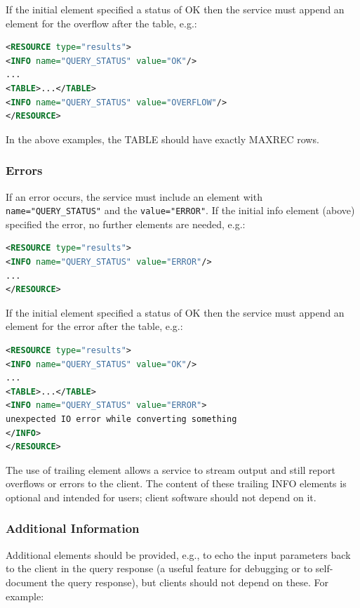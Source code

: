 \documentclass[11pt,letter]{ivoa}
\begin{document}
If the initial  element specified a status of OK then the service must 
append an  element for the overflow after the table, e.g.:

\begin{lstlisting}[language=XML]
<RESOURCE type="results">
<INFO name="QUERY_STATUS" value="OK"/>
...
<TABLE>...</TABLE>
<INFO name="QUERY_STATUS" value="OVERFLOW"/>
</RESOURCE>
\end{lstlisting}

In the above examples, the TABLE should have exactly MAXREC rows.

\subsubsection{Errors}
\label{sect:errors}

If an error occurs, the service must include an  element with 
\verb|name="QUERY_STATUS"| and the \verb|value="ERROR"|. If the initial info element (above) 
specified the error, no further elements are needed, e.g.:

\begin{lstlisting}[language=XML]
<RESOURCE type="results">
<INFO name="QUERY_STATUS" value="ERROR"/>
...
</RESOURCE>
\end{lstlisting}

If the initial  element specified a status of OK then the service must 
append an  element for the error after the table, e.g.:

\begin{lstlisting}[language=XML]
<RESOURCE type="results">
<INFO name="QUERY_STATUS" value="OK"/>
...
<TABLE>...</TABLE>
<INFO name="QUERY_STATUS" value="ERROR">
unexpected IO error while converting something
</INFO>
</RESOURCE>
\end{lstlisting}

The use of trailing  element allows a service to stream output and still 
report overflows or errors to the client. The content of these trailing INFO 
elements is optional and intended for users; client software should not depend 
on it.

\subsubsection{Additional Information}
Additional  elements should be provided, e.g., to echo the input parameters 
back to the client in the query response (a useful feature for debugging or to 
self-document the query response), but clients should not depend on these. For 
example:
\end{document}
